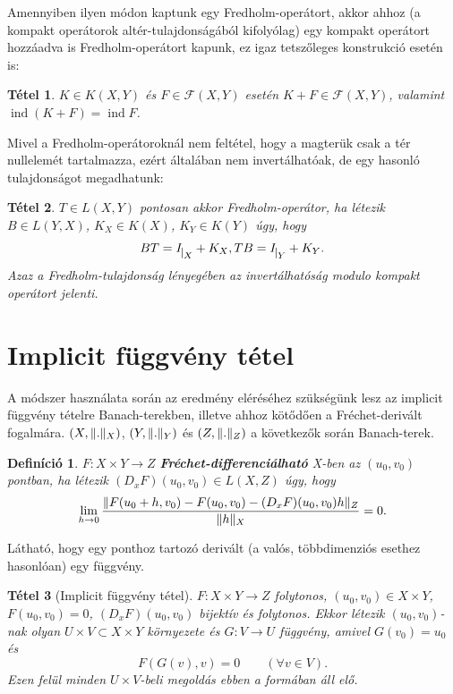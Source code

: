 \documentclass[oneside, titlepage, 12pt, a4paper]{report}
\newtheorem{theorem}{Tétel}[section]
\newtheorem{definition}{Definíció}[section]
\DeclareMathOperator{\ind}{ind}	%
\DeclarePairedDelimiter\norm{\lVert}{\rVert}	%
\begin{document}
Amennyiben ilyen módon kaptunk egy Fredholm-operátort, akkor ahhoz (a kompakt operátorok altér-tulajdonságából kifolyólag) egy kompakt operátort hozzáadva is Fredholm-operátort kapunk, ez igaz tetszőleges konstrukció esetén is:
\begin{theorem}
$K \in K(X, Y)$ és $F \in \mathcal{F}(X, Y)$ esetén $K + F \in \mathcal{F}(X, Y)$, valamint $\ind(K + F) = \ind F$. \cite{FcNotex}
\end{theorem}

Mivel a Fredholm-operátoroknál nem feltétel, hogy a magterük csak a tér nullelemét tartalmazza, ezért általában nem invertálhatóak, de egy hasonló tulajdonságot megadhatunk:	%
\begin{theorem}
$T \in L(X, Y)$ pontosan akkor Fredholm-operátor, ha létezik $B \in L(Y, X)$, $K_X \in K(X)$, $K_Y \in K(Y)$ úgy, hogy
\begin{equation*}
BT = I_{\mkern 1mu \vrule height 2ex\mkern2mu X} + K_X, TB = I_{\mkern 1mu \vrule height 2ex\mkern2mu Y} + K_Y.
\end{equation*}
Azaz a Fredholm-tulajdonság lényegében az invertálhatóság modulo kompakt operátort jelenti. \cite{FcNotex, diffun2}
\end{theorem}

%
\section{Implicit függvény tétel}
\label{sec:implicitfvtetel}

A módszer használata során az eredmény eléréséhez szükségünk lesz az implicit függvény tételre Banach-terekben, illetve ahhoz kötődően a Fréchet-derivált fogalmára. $(X, \norm{.}_X)$, $(Y, \norm{.}_Y)$ és $(Z, \norm{.}_Z)$ a következők során Banach-terek.

\begin{definition}
$F : X \times Y \rightarrow Z$ \textbf{Fréchet-differenciálható} X-ben az $(u_0, v_0)$ pontban, ha létezik $(D_xF)(u_0, v_0) \in L(X, Z)$ úgy, hogy
\begin{equation*}
\lim_{h \to 0} \frac{\norm{F(u_0 + h, v_0) - F(u_0, v_0) - (D_xF)(u_0, v_0)h}_Z}{\norm{h}_X} = 0.
\end{equation*}
\end{definition}
Látható, hogy egy ponthoz tartozó derivált (a valós, többdimenziós esethez hasonlóan) egy függvény.

\begin{theorem}[Implicit függvény tétel]
\label{implicit}
$F : X \times Y \rightarrow Z$ folytonos, $(u_0, v_0) \in X \times Y$, $F(u_0, v_0) = 0$, $(D_xF)(u_0, v_0)$ bijektív és folytonos. Ekkor létezik $(u_0, v_0)$-nak olyan $U \times V \subset X \times Y$ környezete és $G:V \rightarrow U$ függvény, amivel $G(v_0) = u_0$ és
\begin{equation*}
F(G(v), v) = 0 \qquad (\forall v \in V).
\end{equation*}
Ezen felül minden $U \times V$-beli megoldás ebben a formában áll elő. \cite{IFaLS}
\end{theorem}
\end{document}
